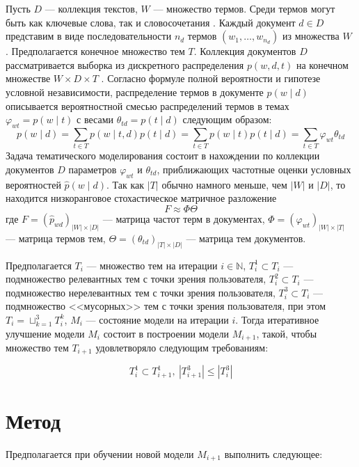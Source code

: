 \documentclass{article}
\begin{document}
Пусть $D$ — коллекция текстов, $W$ — множество термов.
Среди термов могут быть как ключевые слова, так и словосочетания \citep{artm2}.
Каждый документ $d \in D$ представим в виде последовательности $n_d$ термов $\left( w_1, \dots, w_{n_d} \right)$ из множества $W$ \citep{artm}.
Предполагается конечное множество тем $T$.
Коллекция документов $D$ рассматривается выборка из дискретного распределения $p(w, d, t)$ на конечном множестве $W \times D \times T$ \citep{artm2}.
 Согласно формуле полной вероятности и гипотезе условной независимости, распределение термов в документе $p(w \mid d)$ описывается вероятностной смесью распределений термов в темах $\varphi_{wt} = p(w \mid t)$ с весами $\theta_{td} = p (t \mid d)$ следующим образом: \citep{bigartm}
 $$p(w \mid d) = \sum \limits_{t \in T} p(w \mid t, d) p(t \mid d) = \sum \limits_{t \in T} p (w \mid t) p (t \mid d) = \sum \limits_{t \in T} \varphi_{wt} \theta_{td}$$
 Задача тематического моделирования состоит в нахождении по коллекции документов $D$ параметров $\varphi_{wt}$ и $\theta_{td}$, приближающих частотные оценки условных вероятностей $\widehat{p} (w \mid d)$.
 Так как $|T|$ обычно намного меньше, чем $|W|$ и $|D|$, то находится низкоранговое стохастическое матричное разложение \citep{artm2}
 $$F \approx \Phi \Theta$$ 
 где $F = {(\widehat{p}_{wd})}_{|W| \times |D|}$ — матрица частот терм в документах, $\Phi = {(\varphi_{wt})}_{|W| \times |T|}$ — матрица термов тем, $\Theta = {(\theta_{td})}_{|T| \times |D|}$ — матрица тем документов.

Предполагается $T_i$ — множество тем на итерации $i \in \mathbb{N}$,  $T_i^1 \subset T_i$ — подмножество релевантных тем с точки зрения пользователя, $T_i^2 \subset T_i$ — подмножество нерелевантных тем с точки зрения пользователя, $T_i^3 \subset T_i$ — подмножество <<мусорных>> тем с точки зрения пользователя, при этом $T_i = \sqcup_{k = 1}^3 T_i^k$, $M_i$ — состояние модели на итерации $i$.
Тогда итеративное улучшение модели $M_i$ состоит в построении модели $M_{i + 1}$, такой, чтобы множество тем $T_{i + 1}$ удовлетворяло следующим требованиям:

$$T_i^1 \subset T_{i + 1}^1, \ \left| T_{i + 1}^3 \right| \leq \left| T_i^3 \right|$$

\section{Метод}

Предполагается при обучении новой модели $M_{i + 1}$ выполнить следующее:
\end{document}
